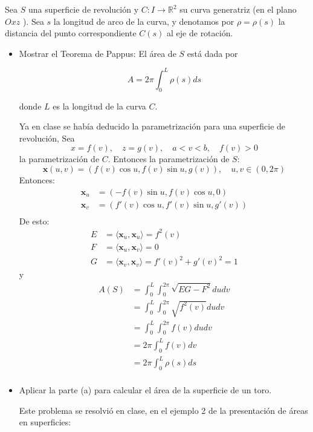 \begin{problema}
    Sea $S$ una superficie de revolución y $C: I \rightarrow \mathbb{R}^{2}$ su curva generatriz (en el plano $O x z$ ). Sea $s$ la longitud de arco de la curva, y denotamos por $\rho=\rho(s)$ la distancia del punto correspondiente $C(s)$ al eje de rotación.
    \begin{itemize}
        \item Mostrar el Teorema de Pappus: El área de $S$ está dada por

        $$
        A=2 \pi \int_{0}^{L} \rho(s) d s
        $$
        
        donde $L$ es la longitud de la curva $C$.
        \begin{dem}
            Ya en clase se había deducido la parametrización para una superficie de revolución, Sea $$x=f(v),\quad z=g(v),\quad a<v<b, \quad f(v)>0$$
            la parametrización de $C$. Entonces la parametrización de $S$: 
            $$\mathbf{x}(u,v)=(f(v)\cos u, f(v)\sin u, g(v)), \quad u,v\in (0,2\pi)$$
            Entonces: 
            \begin{align*}
                \mathbf{x}_u &=\left(-f(v)\sin u, f(v)\cos u, 0\right)\\
                \mathbf{x}_v &=\left(f'(v)\cos u, f'(v)\sin u, g'(v)\right)\\
            \end{align*}
            De esto: 
            \begin{align*}
                E &= \langle \mathbf{x}_u, \mathbf{x}_u \rangle = f^2(v)\\
                F &= \langle \mathbf{x}_u, \mathbf{x}_v \rangle = 0\\
                G &= \langle \mathbf{x}_v, \mathbf{x}_v \rangle = f'(v)^2+ g'(v)^2 =1
            \end{align*}
            y 
            \begin{align*}
                A(S) &= \int_0^L \int_0^{2\pi} \sqrt{EG -F^2}du dv\\
                &=\int_0^L \int_0^{2\pi} \sqrt{f^2(v)}du dv\\
                &=\int_0^L \int_0^{2\pi} f(v)du dv\\
                &=2\pi\int_0^L f(v) dv\\
                &= 2\pi\int_0^L \rho(s) ds\\
            \end{align*}
        \end{dem}
        \item Aplicar la parte (a) para calcular el área de la superficie de un toro.
        \begin{dem}
            Este problema se resolvió en clase, en el ejemplo 2 de la presentación de áreas en superficies: 


\end{dem}
\end{itemize}
\end{problema}
